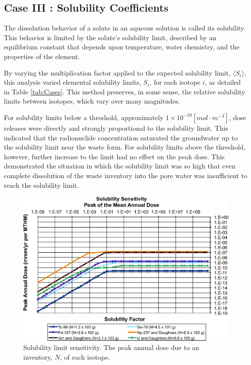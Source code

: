 
\subsection{Case III : Solubility Coefficients}

The dissolution behavior of a solute in an aqueous solution is called its 
solubility. This behavior is limited by the solute's solubility limit, described  
by an equilibrium constant that depends upon temperature, water chemistry, and 
the properties of the element. 

By varying the multiplication factor applied to the expected solubility limit, 
$\langle S_i\rangle$, this analysis varied elemental solubility limits, $S_i$, 
for each isotope $i$, as detailed in Table \ref{tab:Cases}.
This method preserves, in some sense, the relative solubility 
limits between isotopes, which vary over many magnitudes.

For solubility limits below a threshold, approximately 
$1\times10^{-10}[mol\cdot m^{-3}]$, dose releases were directly 
and strongly proportional to the solubility limit. This indicated that the radionuclide 
concentration saturated the groundwater up to the solubility limit near the 
waste form.  For solubility limits above the threshold, however, further 
increase to the limit had no effect on the peak dose. This demonstrated the 
situation in which the solubility limit was so high that even complete 
dissolution of the waste inventory into the pore water was insufficient to reach 
the solubility limit.

\begin{figure}[H]
  \centering
  \includegraphics[width=\linewidth]{solubility.eps}
  \caption{Solubility limit sensitivity. The peak annual dose due to an 
  inventory, 
  $N$, of each isotope.}
  \label{fig:SolSum}
\end{figure}
